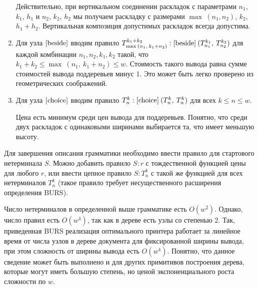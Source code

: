 \begin{enumerate}
Действительно, при вертикальном соединении раскладок с параметрами
$n_1$, $k_1$, $h_1$ и $n_2$, $k_2$, $h_2$ мы получаем раскладку с размерами
$\max\:(n_1,n_2)$, $k_2$, $h_1+h_2$. Вертикальная композиция допустимых раскладок всегда допустима.

\item Для узла $[\mbox{\lstinline{beside}}]$ вводим правило
  $T^{k_1+k_2}_{\max\:(n_1,\:k_1+n_2)}:[\mbox{\lstinline{beside}}]\:(T^{k_1}_{n_1},\:T^{k_2}_{n_2})$
  для каждой комбинации $n_1, n_2, k_1, k_2$ такой, что $k_1+k_2\le\max\:(n_1,\:k_1+n_2)\le w$.
  Стоимость такого вывода равна сумме стоимостей вывода поддеревьев минус 1.
  Это может быть легко проверено из геометрических соображений.

\item Для узла $[\mbox{\lstinline{choice}}]$ вводим правило
  $T^k_n:[\mbox{\lstinline{choice}}]\:(T^k_n,\:T^k_n)$ для всех $k\le n\le w$.

  Цена есть минимум среди цен вывода для поддеревьев. Понятно, что среди двух раскладок
  с одинаковыми ширинами выбирается та, что имеет меньшую высоту.
\end{enumerate}

Для завершения описания грамматики необходимо ввести правило для стартового нетерминала $S$.
Можно добавить правило $S : r$ с тождественной функцией цены для любого $r$, или ввести
цепное правило $S: T_n^k$ с такой же функцией для всех нетерминалов $T_n^k$
(такое правило требует несущественного расширения определения BURS).

Число нетерминалов в определенной выше грамматике есть $O(w^2)$.
Однако, число правил есть $O(w^4)$, так
как в дереве есть узлы со степенью 2. Так, приведенная BURS реализация оптимального принтера
работает за линейное время от числа узлов в дереве документа для фиксированной ширины вывода, при
этом сложность от ширины вывода есть $O(w^4)$. Понятно, что данное сведение может быть выполнено и
для других примитивов построения дерева, которые могут иметь большую степень, но ценой
экспоненциального роста сложности по $w$.
